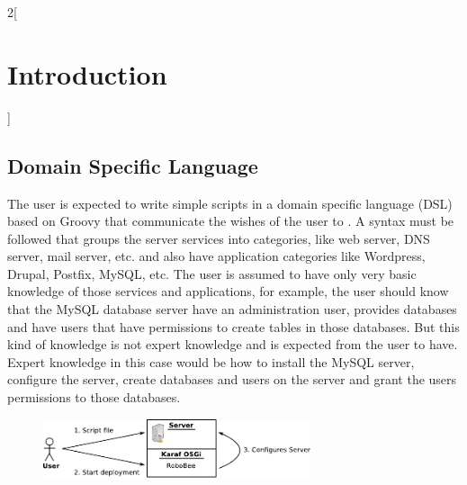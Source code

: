 \begin{multicols}{2}[\chapter{Introduction}]
\section{Domain Specific Language}

The user is expected to write simple scripts in a domain specific language (DSL)
based on Groovy that communicate the wishes of the user to \AppName{}. A syntax
must be followed that groups the server services into categories, like web server,
DNS server, mail server, etc. and also have application categories like Wordpress,
Drupal, Postfix, MySQL, etc. The user is assumed to have only very basic knowledge 
of those services and applications, for example, the user should know that the MySQL database
server have an administration user, provides databases and have users that have
permissions to create tables in those databases. But this kind of knowledge
is not expert knowledge and is expected from the user to have. Expert knowledge in this
case would be how to install the MySQL server, configure the server, create
databases and users on the server and grant the users permissions to those databases.

\end{multicols}

\begin{figure}[h]
\begin{center}
\includegraphics[width=0.7\textwidth]{sscontrol-overview_en} \\
\end{center}
\end{figure}

